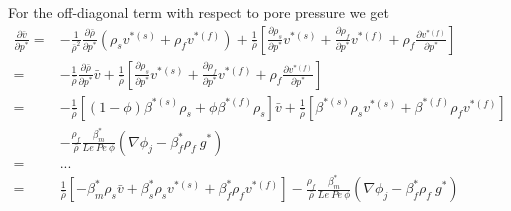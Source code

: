 \documentclass[]{scrreprt}
\begin{document}
For the off-diagonal term with respect to pore pressure we get
\begin{subequations}
  \begin{align}
  \frac{\partial \bar{v}}{\partial p^*} =& -\frac{1}{\bar{\rho}^2}\frac{\partial \bar{\rho}}{\partial p^*} (\rho_s v^{*(s)} + \rho_f v^{*(f)}) + \frac{1}{\bar{\rho}} \left[ \frac{\partial \rho_s}{\partial p^*}v^{*(s)} +\frac{\partial \rho_f}{\partial p^*}v^{*(f)} +\rho_f\frac{\partial v^{*(f)}}{\partial p^*}  \right]\\ \nonumber
  =& -\frac{1}{\bar{\rho}}\frac{\partial \bar{\rho}}{\partial p^*}\bar{v} + \frac{1}{\bar{\rho}} \left[ \frac{\partial \rho_s}{\partial p^*}v^{*(s)} +\frac{\partial \rho_f}{\partial p^*}v^{*(f)} +\rho_f\frac{\partial v^{*(f)}}{\partial p^*}  \right]\\ \nonumber
  =& -\frac{1}{\bar{\rho}}\left[(1-\phi)\beta^{*(s)}\rho_s + \phi\beta^{*(f)}\rho_s \right]\bar{v} + \frac{1}{\bar{\rho}} \left[ \beta^{*(s)}\rho_s v^{*(s)} + \beta^{*(f)}\rho_f v^{*(f)} \right] \\ \nonumber
  &- \frac{\rho_f}{\bar{\rho}}\frac{\beta^*_m}{Le\:Pe\:\phi} \left(\nabla \phi_j - \beta^*_f\rho_f\:g^* \right)  \\ \nonumber
  =& ... \\ \nonumber
  =& \frac{1}{\bar{\rho}}\left[ -\beta^*_m \rho_s \bar{v} + \beta^*_s \rho_s v^{*(s)} + \beta^*_f \rho_f v^{*(f)}    \right] - \frac{\rho_f}{\bar{\rho}}\frac{\beta^*_m}{Le\:Pe\:\phi} \left(\nabla \phi_j - \beta^*_f\rho_f\:g^* \right)  \\ \nonumber
  \end{align}
\end{subequations}



%

\nocite{*}
\end{document}
